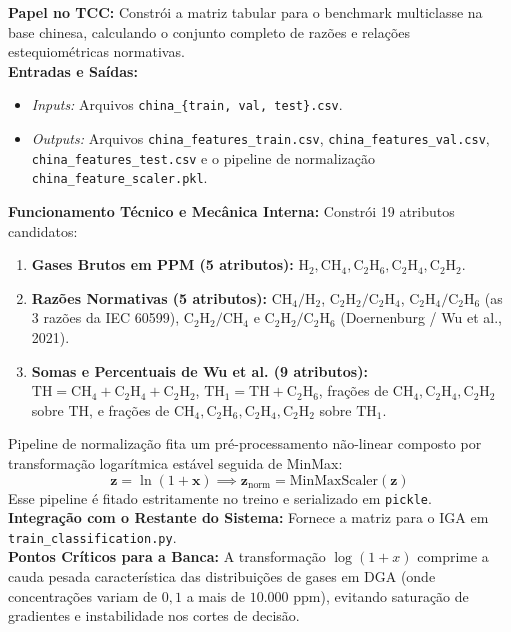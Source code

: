 \documentclass[10pt,a4paper]{article}
\begin{document}
\begin{filebox}
\textbf{Papel no TCC:} Constrói a matriz tabular para o benchmark multiclasse na base chinesa, calculando o conjunto completo de razões e relações estequiométricas normativas.\\
\textbf{Entradas e Saídas:}
\begin{itemize}[leftmargin=*,itemsep=1pt]
  \item \textit{Inputs:} Arquivos \texttt{china\_\{train, val, test\}.csv}.
  \item \textit{Outputs:} Arquivos \texttt{china\_features\_train.csv}, \texttt{china\_features\_val.csv}, \texttt{china\_features\_test.csv} e o pipeline de normalização \texttt{china\_feature\_scaler.pkl}.
\end{itemize}
\textbf{Funcionamento Técnico e Mecânica Interna:} 
Constrói 19 atributos candidatos:
\begin{enumerate}[leftmargin=*,itemsep=1pt]
  \item \textbf{Gases Brutos em PPM (5 atributos):} $\text{H}_2, \text{CH}_4, \text{C}_2\text{H}_6, \text{C}_2\text{H}_4, \text{C}_2\text{H}_2$.
  \item \textbf{Razões Normativas (5 atributos):} $\text{CH}_4/\text{H}_2$, $\text{C}_2\text{H}_2/\text{C}_2\text{H}_4$, $\text{C}_2\text{H}_4/\text{C}_2\text{H}_6$ (as 3 razões da IEC 60599), $\text{C}_2\text{H}_2/\text{CH}_4$ e $\text{C}_2\text{H}_2/\text{C}_2\text{H}_6$ (Doernenburg / Wu et al., 2021).
  \item \textbf{Somas e Percentuais de Wu et al. (9 atributos):} $\text{TH} = \text{CH}_4 + \text{C}_2\text{H}_4 + \text{C}_2\text{H}_2$, $\text{TH}_1 = \text{TH} + \text{C}_2\text{H}_6$, frações de $\text{CH}_4, \text{C}_2\text{H}_4, \text{C}_2\text{H}_2$ sobre $\text{TH}$, e frações de $\text{CH}_4, \text{C}_2\text{H}_6, \text{C}_2\text{H}_4, \text{C}_2\text{H}_2$ sobre $\text{TH}_1$.
\end{enumerate}
Pipeline de normalização fita um pré-processamento não-linear composto por transformação logarítmica estável seguida de MinMax:
$$\mathbf{z} = \ln(1 + \mathbf{x}) \implies \mathbf{z}_{\text{norm}} = \text{MinMaxScaler}(\mathbf{z})$$
Esse pipeline é fitado estritamente no treino e serializado em \texttt{pickle}.\\
\textbf{Integração com o Restante do Sistema:} Fornece a matriz para o IGA em \texttt{train\_classification.py}.\\
\textbf{Pontos Críticos para a Banca:} A transformação $\log(1+x)$ comprime a cauda pesada característica das distribuições de gases em DGA (onde concentrações variam de $0,1$ a mais de $10.000$ ppm), evitando saturação de gradientes e instabilidade nos cortes de decisão.
\end{filebox}
\end{document}
